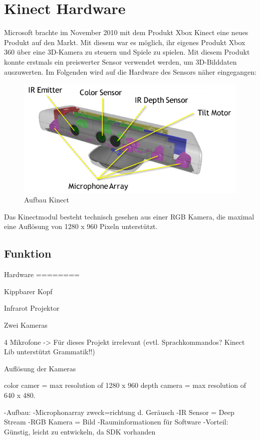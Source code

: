 \section{Kinect Hardware}
Microsoft brachte im November 2010 mit dem Produkt Xbox Kinect eine neues Produkt auf den Markt. Mit diesem war es möglich, ihr eigenes Produkt Xbox 360 über eine 3D-Kamera zu steuern und Spiele zu spielen. 
Mit diesem Produkt konnte erstmals ein preiswerter Sensor verwendet werden, um 3D-Bilddaten auszuwerten.
Im Folgenden wird auf die Hardware des Sensors näher eingegangen:

\begin{figure}[H]						
	\centering							
	\includegraphics[scale=0.9]{Bilder/kinect_sensor_aufbau.png}			
	\caption{Aufbau Kinect\cite{ws:microsoft_kinect}}						
	\label{f:kinect_hardware}						
\end{figure}



Das Kinectmodul besteht technisch gesehen aus einer RGB Kamera, die maximal eine Auflösung von 1280 x 960 Pixeln unterstützt. 
\cite{webb2012beginning}


\subsection{Funktion}

	\cite{jana2012kinect}



Hardware
========

Kippbarer Kopf

Infrarot Projektor

Zwei Kameras

4 Mikrofone -> Für dieses Projekt irrelevant (evtl. Sprachkommandos? Kinect Lib unterstützt Grammatik!!)

Auflösung der Kameras

	color camer 	= max resolution of 1280 x 960 
	depth camera 	= max resolution of 640 x 480.

-Aufbau: 	-Microphonarray zweck=richtung d. Geräusch
			-IR Sensor = Deep Stream
			-RGB Kamera = Bild
-Rauminformationen für Software
-Vorteil: Günstig, leicht zu entwickeln, da SDK vorhanden